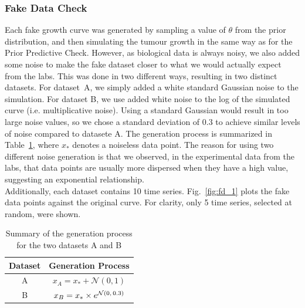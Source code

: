 \documentclass[11pt]{article}
\begin{document}
\subsubsection{Fake Data Check}
Each fake growth curve was generated by sampling a value of $\theta$ from the prior distribution, and then simulating the tumour growth in the same way as for the Prior Predictive Check. However, as biological data is always noisy, we also added some noise to make the fake dataset closer to what we would actually expect from the labs. This was done in two different ways, resulting in two distinct datasets. For dataset~A, we simply added a white standard Gaussian noise to the simulation. For dataset B, we use added white noise to the log of the simulated curve (i.e. multiplicative noise). Using a standard Gaussian would result in too large noise values, so we chose a standard deviation of 0.3 to achieve similar levels of noise compared to datasete A. The generation process is summarized in Table~\ref{tbl:genproc}, where $x_*$ denotes a noiseless data point. The reason for using two different noise generation is that we observed, in the experimental data from the labs, that data points are usually more dispersed when they have a high value, suggesting an exponential relationship.\\ 
Additionally, each dataset contains 10 time series. Fig.~\ref{fig:fd_1} plots the fake data points against the original curve. For clarity, only 5 time series, selected at random, were shown.\\
\begin{table}[h!]
    \centering
    \caption{Summary of the generation process for the two datasets A and B}
    \begin{tabular}{c|c}
        \hline
        Dataset & Generation Process \\ \hline 
        A       & $x_A=x_*+\mathcal{N}(0,1)$ \\
        B       & $x_B=x_*\times e^{\mathcal{N}(0,\hspace{1.5px}0.3)}$ \\ \hline
    \end{tabular}
    \label{tbl:genproc}
\end{table}
\end{document}
